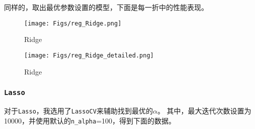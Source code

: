 \documentclass[12pt, a4paper, oneside]{ctexart}
\begin{document}
同样的，取出最优参数设置的模型，下面是每一折中的性能表现。

\begin{figure}[H]
    \centering
    \texttt{[image: Figs/reg\_Ridge.png]}
    \caption{Ridge}
\end{figure}

\begin{figure}[H]
    \centering
    \texttt{[image: Figs/reg\_Ridge\_detailed.png]}
    \caption{Ridge}
\end{figure}

\subsubsection{\texttt{Lasso}}
对于\texttt{Lasso}，我选用了\texttt{LassoCV}来辅助找到最优的$\alpha$。
其中，最大迭代次数设置为10000，并使用默认的\texttt{n\_alpha}=100，得到下面的数据。
\end{document}
